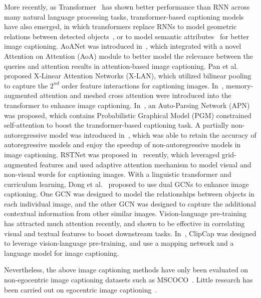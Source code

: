 \documentclass[journal]{IEEEtran}
\begin{document}
More recently, as Transformer~\cite{vaswani2017attention} has shown better performance than RNN across many natural language processing tasks, transformer-based captioning models have also emerged, in which transformers replace RNNs to model geometric relations between detected objects~\cite{herdade2019image}, or to model semantic attributes~\cite{li2019entangled} for better image captioning. AoANet was introduced in~\cite{huang2019attention}, which integrated with a novel Attention on Attention (AoA) module to better model the relevance between the queries and attention results in attention-based image captioning. Pan et al.~\cite{xlinear2020cvpr} proposed X-Linear Attention Networks (X-LAN), which utilized bilinear pooling to capture the $2^{nd}$ order feature interactions for captioning images. In~\cite{cornia2020meshed}, memory-augmented attention and meshed cross attention were introduced into the transformer to enhance image captioning. In~\cite{yang2021auto}, an Auto-Parsing Network (APN) was proposed, which contains Probabilistic Graphical Model (PGM) constrained self-attention to boost the transformer-based captioning task. A partially non-autoregressive model was introduced in~\cite{fei2021partially}, which was able to retain the accuracy of autoregressive models and enjoy the speedup of non-autoregressive models in image captioning. RSTNet was proposed in~\cite{zhang2021rstnet} recently, which leveraged grid-augmented features and used adaptive attention mechanism to model visual and non-visual words for captioning images. With a linguistic transformer and curriculum learning, Dong et al.~\cite{dong2021dual} proposed to use dual GCNs to enhance image captioning. One GCN was designed to model the relationships between objects in each individual image, and the other GCN was designed to capture the additional contextual information from other similar images. Vision-language pre-training~\cite{radford2021learning, wang2022simvlm} has attracted much attention recently, and shown to be effective in correlating visual and textual features to boost downstream tasks. In~\cite{mokady2021clipcap}, ClipCap was designed to leverage vision-language pre-training, and use a mapping network and a language model for image captioning.

Nevertheless, the above image captioning methods have only been evaluated on non-egocentric image captioning datasets such as MSCOCO~\cite{lin2014microsoft}. Little research has been carried out on egocentric image captioning~\cite{fan2018deepdiary,agarwal2020egoshots}.
\end{document}
